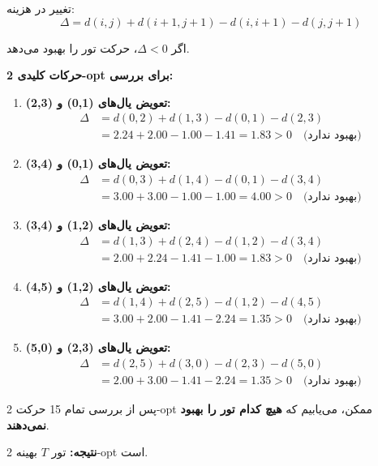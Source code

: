 \documentclass[12pt,a4paper]{article}
\begin{document}
تغییر در هزینه:
\[
\Delta = d(i,j) + d(i+1,j+1) - d(i,i+1) - d(j,j+1)
\]

اگر $\Delta < 0$، حرکت تور را بهبود می‌دهد.

\textbf{حرکات کلیدی 2-opt برای بررسی:}

\begin{enumerate}
    \item \textbf{تعویض یال‌های (0,1) و (2,3):}
    \begin{align*}
    \Delta &= d(0,2) + d(1,3) - d(0,1) - d(2,3) \\
    &= 2.24 + 2.00 - 1.00 - 1.41 = 1.83 > 0 \quad \text{(بهبود ندارد)}
    \end{align*}
    
    \item \textbf{تعویض یال‌های (0,1) و (3,4):}
    \begin{align*}
    \Delta &= d(0,3) + d(1,4) - d(0,1) - d(3,4) \\
    &= 3.00 + 3.00 - 1.00 - 1.00 = 4.00 > 0 \quad \text{(بهبود ندارد)}
    \end{align*}
    
    \item \textbf{تعویض یال‌های (1,2) و (3,4):}
    \begin{align*}
    \Delta &= d(1,3) + d(2,4) - d(1,2) - d(3,4) \\
    &= 2.00 + 2.24 - 1.41 - 1.00 = 1.83 > 0 \quad \text{(بهبود ندارد)}
    \end{align*}
    
    \item \textbf{تعویض یال‌های (1,2) و (4,5):}
    \begin{align*}
    \Delta &= d(1,4) + d(2,5) - d(1,2) - d(4,5) \\
    &= 3.00 + 2.00 - 1.41 - 2.24 = 1.35 > 0 \quad \text{(بهبود ندارد)}
    \end{align*}
    
    \item \textbf{تعویض یال‌های (2,3) و (5,0):}
    \begin{align*}
    \Delta &= d(2,5) + d(3,0) - d(2,3) - d(5,0) \\
    &= 2.00 + 3.00 - 1.41 - 2.24 = 1.35 > 0 \quad \text{(بهبود ندارد)}
    \end{align*}
\end{enumerate}

پس از بررسی تمام 15 حرکت 2-opt ممکن، می‌یابیم که \textbf{هیچ کدام تور را بهبود نمی‌دهند}.

\textbf{نتیجه:} تور $T$ بهینه 2-opt است.
\end{document}
